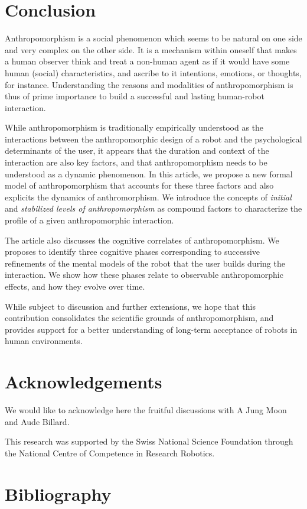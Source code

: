 \documentclass{frontiersSCNS} %
\begin{document}
\section{Conclusion}
\label{sec:conclusion}

Anthropomorphism is a social phenomenon which seems to be natural on one side
and very complex on the other side. It is a mechanism within oneself that makes
a human observer think and treat a non-human agent as if it would have some
human (social) characteristics, and ascribe to it intentions, emotions, or
thoughts, for instance. Understanding the reasons and modalities of
anthropomorphism is thus of prime importance to build a successful and lasting
human-robot interaction.

While anthropomorphism is traditionally empirically understood as the
interactions between the anthropomorphic design of a robot and the psychological
determinants of the user, it appears that the duration and context of the
interaction are also key factors, and that anthropomorphism needs to be
understood as a dynamic phenomenon. In this article, we propose a new formal
model of anthropomorphism that accounts for these three factors and also
explicits the dynamics of anthromorphism. We introduce the concepts of
\emph{initial} and \emph{stabilized levels of anthropomorphism} as compound
factors to characterize the profile of a given anthropomorphic interaction.

The article also discusses the cognitive correlates of anthropomorphism. We
proposes to identify three cognitive phases corresponding to successive
refinements of the mental models of the robot that the user builds during the
interaction. We show how these phases relate to observable anthropomorphic
effects, and how they evolve over time.

While subject to discussion and further extensions, we hope that this
contribution consolidates the scientific grounds of anthropomorphism, and
provides support for a better understanding of long-term acceptance of robots in
human environments.

\section*{Acknowledgements}

We would like to acknowledge here the fruitful discussions with A Jung Moon and
Aude Billard.

This research was supported by the Swiss National Science Foundation through
the National Centre of Competence in Research Robotics.

\section{Bibliography}

\end{document}
